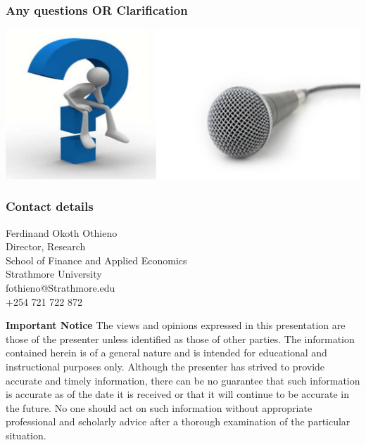 \documentclass{beamer}
\begin{document}
\begin{frame}
\frametitle{\textbf{Any questions OR Clarification}}
\includegraphics[width=\textwidth]{Questions}
\end{frame}



\begin{frame}
\frametitle{\textbf{Contact details}}
\begin{center}
Ferdinand Okoth Othieno\\
Director, Research\\ 
School of Finance and Applied Economics\\
Strathmore University\\
fothieno@Strathmore.edu\\

+254 721 722 872

\end{center}
\begin{block}{\textbf{Important Notice}}
\small The views and opinions expressed in this presentation are those of the presenter unless identified as those of other parties. The information contained herein is of a general nature and is intended for educational and instructional purposes only. Although the presenter has strived to provide accurate and timely information, there can be no guarantee that such information is accurate as of the date it is received or that it will continue to be accurate in the future. No one should act on such information without appropriate professional and scholarly advice after a thorough examination of the particular situation.

\end{block}
\end{frame}


\end{document}
